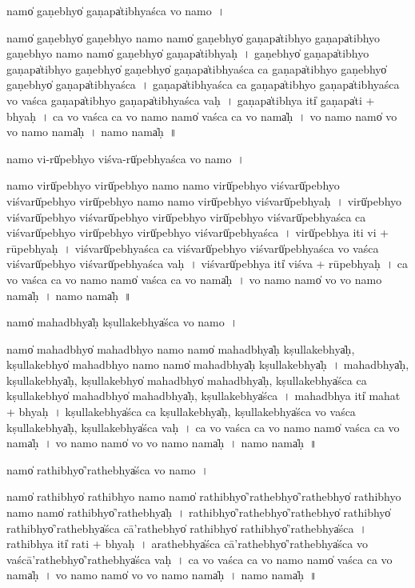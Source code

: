 \documentclass[parskip, DIV=14]{scrartcl}
\begin{document}
{namo̍ ga॒ṇebhyo̍ ga॒ṇapa̍tibhyaśca vo॒ namo॒~।

namo̍ ga॒ṇebhyo̍ ga॒ṇebhyo॒ namo॒ namo̍ ga॒ṇebhyo̍ ga॒ṇapa̍tibhyo ga॒ṇapa̍tibhyo ga॒ṇebhyo॒ namo॒ namo̍ ga॒ṇebhyo̍ ga॒ṇapa̍tibhyaḥ~।
ga॒ṇebhyo̍ ga॒ṇapa̍tibhyo ga॒ṇapa̍tibhyo ga॒ṇebhyo̍ ga॒ṇebhyo̍ ga॒ṇapa̍tibhyaśca ca ga॒ṇapa̍tibhyo ga॒ṇebhyo̍ ga॒ṇebhyo̍ ga॒ṇapa̍tibhyaśca~।
ga॒ṇapa̍tibhyaśca ca ga॒ṇapa̍tibhyo ga॒ṇapa̍tibhyaśca vo vaśca ga॒ṇapa̍tibhyo ga॒ṇapa̍tibhyaśca vaḥ~।
ga॒ṇapa̍tibhya॒ iti̍ ga॒ṇapa̍ti + bhya॒ḥ~।
ca॒ vo॒ va॒śca॒ ca॒ vo॒ namo॒ namo̍ vaśca ca vo॒ nama̍ḥ~।
vo॒ namo॒ namo̍ vo vo॒ namo॒ nama̍ḥ~।
namo॒ nama̍ḥ~॥ 

namo॒ vi-rū̍pebhyo vi॒śva-rū̍pebhyaśca vo॒ namo॒~।

namo॒ virū̍pebhyo॒   virū̍pebhyo॒ namo॒ namo॒ virū̍pebhyo vi॒śvarū̍pebhyo vi॒śvarū̍pebhyo॒ virū̍pebhyo॒ namo॒ namo॒ virū̍pebhyo vi॒śvarū̍pebhyaḥ~।
virū̍pebhyo vi॒śvarū̍pebhyo vi॒śvarū̍pebhyo॒ virū̍pebhyo॒ virū̍pebhyo vi॒śvarū̍pebhyaśca ca vi॒śvarū̍pebhyo॒ virū̍pebhyo॒ virū̍pebhyo vi॒śvarū̍pebhyaśca~। %
virū̍pebhya॒ iti॒ vi + rū॒pe॒bhya॒ḥ~।
vi॒śvarū̍pebhyaśca ca vi॒śvarū̍pebhyo vi॒śvarū̍pebhyaśca vo vaśca vi॒śvarū̍pebhyo vi॒śvarū̍pebhyaśca vaḥ~।
vi॒śvarū̍pebhya॒ iti̍ vi॒śva + rū॒pe॒bhya॒ḥ~।
ca॒ vo॒ va॒śca॒ ca॒ vo॒ namo॒ namo̍ vaśca ca vo॒ nama̍ḥ~।
vo॒ namo॒ namo̍ vo vo॒ namo॒ nama̍ḥ~।
namo॒ nama̍ḥ~॥ 

namo̍ ma॒hadbhya̍ḥ kṣulla॒kebhya̍śca vo॒ namo॒~।

namo̍ ma॒hadbhyo̍ ma॒hadbhyo॒ namo॒ namo̍ ma॒hadbhya̍ḥ kṣulla॒kebhya̍ḥ, kṣulla॒kebhyo̍ ma॒hadbhyo॒ namo॒ namo̍ ma॒hadbhya̍ḥ kṣulla॒kebhya̍ḥ~।
ma॒hadbhya̍ḥ, kṣulla॒kebhya̍ḥ, kṣulla॒kebhyo̍ ma॒hadbhyo̍ ma॒hadbhya̍ḥ, kṣulla॒kebhya̍śca ca kṣulla॒kebhyo̍ ma॒hadbhyo̍ ma॒hadbhya̍ḥ, kṣulla॒kebhya̍śca~।
ma॒hadbhya॒ iti̍ ma॒hat + bhya॒ḥ~।
kṣu॒lla॒kebhya̍śca ca kṣulla॒kebhya̍ḥ, kṣulla॒kebhya̍śca vo vaśca kṣulla॒kebhya̍ḥ, kṣulla॒kebhya̍śca vaḥ~।
ca॒ vo॒ va॒śca॒ ca॒ vo॒ namo॒ namo̍ vaśca ca vo॒ nama̍ḥ~।
vo॒ namo॒ namo̍ vo vo॒ namo॒ nama̍ḥ~।
namo॒ nama̍ḥ~॥ 

namo̍ ra॒thibhyo̍'ra॒thebhya̍śca vo॒ namo॒~।

namo̍ ra॒thibhyo̍ ra॒thibhyo॒ namo॒ namo̍ ra॒thibhyo̍'ra॒thebhyo̍'ra॒thebhyo̍ ra॒thibhyo॒ namo॒ namo̍ ra॒thibhyo̍'ra॒thebhya̍ḥ~।
ra॒thibhyo̍'ra॒thebhyo̍'ra॒thebhyo̍ ra॒thibhyo̍ ra॒thibhyo̍'ra॒thebhya̍śca cā'ra॒thebhyo̍ ra॒thibhyo̍ ra॒thibhyo̍'ra॒thebhya̍śca~।
ra॒thibhya॒ iti̍ ra॒ti + bhya॒ḥ~।
a॒ra॒thebhya̍śca cā'ra॒thebhyo̍'ra॒thebhya̍śca vo vaścā'ra॒thebhyo̍'ra॒thebhya̍śca vaḥ~।
ca॒ vo॒ va॒śca॒ ca॒ vo॒ namo॒ namo̍ vaśca ca vo॒ nama̍ḥ~।
vo॒ namo॒ namo̍ vo vo॒ namo॒ nama̍ḥ~।
namo॒ nama̍ḥ~॥ 

}
\end{document}
